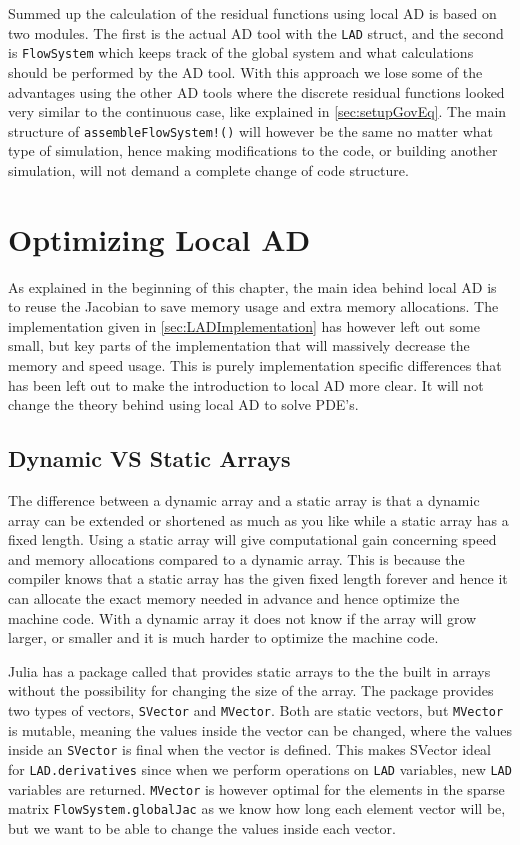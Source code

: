 Summed up the calculation of the residual functions using local AD is based on two modules. The first is the actual AD tool with the \texttt{LAD} struct, and the second is \texttt{FlowSystem} which keeps track of the global system and what calculations should be performed by the AD tool. With this approach we lose some of the advantages using the other AD tools where the discrete residual functions looked very similar to the continuous case, like explained in \autoref{sec:setupGovEq}. The main structure of \texttt{assembleFlowSystem!()} will however be the same no matter what type of simulation, hence making modifications to the code, or building another simulation, will not demand a complete change of code structure. 

\section{Optimizing Local AD}
As explained in the beginning of this chapter, the main idea behind local AD is to reuse the Jacobian to save memory usage and extra memory allocations. The implementation given in \autoref{sec:LADImplementation} has however left out some small, but key parts of the implementation that will massively decrease the memory and speed usage. This is purely implementation specific differences that has been left out to make the introduction to local AD more clear. It will not change the theory behind using local AD to solve PDE's.

\subsection{Dynamic VS Static Arrays}
The difference between a dynamic array and a static array is that a dynamic array can be extended or shortened as much as you like while a static array has a fixed length. Using a static array will give computational gain concerning speed and memory allocations compared to a dynamic array. This is because the compiler knows that a static array has the given fixed length forever and hence it can allocate the exact memory needed in advance and hence optimize the machine code. With a dynamic array it does not know if the array will grow larger, or smaller and it is much harder to optimize the machine code. 

Julia has a package called \emph{\cite{StaticArrays}} that provides static arrays to the the built in arrays without the possibility for changing the size of the array. The package provides two types of vectors, \texttt{SVector} and \texttt{MVector}. Both are static vectors, but \texttt{MVector} is mutable, meaning the values inside the vector can be changed, where the values inside an \texttt{SVector} is final when the vector is defined. This makes SVector ideal for \texttt{LAD.derivatives} since when we perform operations on \texttt{LAD} variables, new \texttt{LAD} variables are returned. \texttt{MVector} is however optimal for the elements in the sparse matrix \texttt{FlowSystem.globalJac} as we know how long each element vector will be, but we want to be able to change the values inside each vector. 

